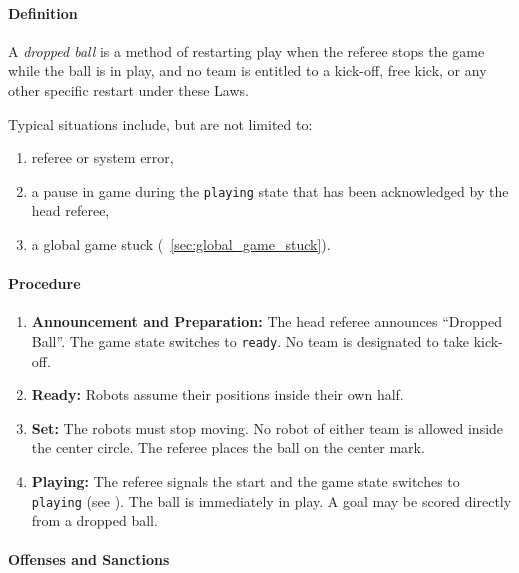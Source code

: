 \label{sec:dropped_ball}

\paragraph{Definition}

A \emph{dropped ball} is a method of restarting play when the referee stops the game while the ball is in play, and no team is entitled to a kick-off, free kick, or any other specific restart under these Laws.

Typical situations include, but are not limited to:
\begin{enumerate}
    \item referee or system error,
    \item a pause in game during the \texttt{playing} state that has been acknowledged by the head referee,
    \item a global game stuck (\cf~\cref{sec:global_game_stuck}).
\end{enumerate}

\paragraph{Procedure}

\begin{enumerate}
    \item \textbf{Announcement and Preparation:} 
    	The head referee announces ``Dropped Ball''. 
    	The game state switches to \texttt{ready}.
    	No team is designated to take kick-off.

	\item \textbf{Ready:}
    	Robots assume their positions inside their own half.
    	
    \item \textbf{Set:}
    	The robots must stop moving.
    	No robot of either team is allowed inside the center circle.
		The referee places the ball on the center mark.

    \item \textbf{Playing:} 
    	The referee signals the start and the game state switches to \texttt{playing} (see ). 
    	The ball is immediately in play.
		A goal may be scored directly from a dropped ball.
\end{enumerate}

\paragraph{Offenses and Sanctions}

